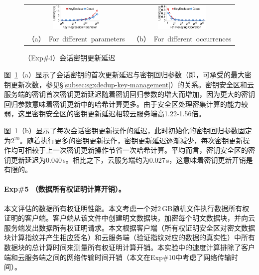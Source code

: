 \begin{figure}[!htb]
    \centering
    \begin{tabular}{@{\ }c@{\ }c}
    \includegraphics[width=0.48\textwidth]{pic/sgxdedup/expa5_keyRegression_time.pdf} &
    \includegraphics[width=0.48\textwidth]{pic/sgxdedup/expa5_keyRegression_time_default.pdf} \\
    \mbox{\small （a） For different parameters} &
    \mbox{\small （b） For different occurrences}
    \end{tabular}
    \caption{（Exp\#4）会话密钥更新延迟}
    \label{fig:sgxdedup-rekeyingLatency}
\end{figure}
    
图~\ref{fig:sgxdedup-rekeyingLatency}（a）显示了会话密钥的首次更新延迟与密钥回归参数（即，可承受的最大密钥更新次数，参见\S\ref{subsec:sgxdedup-key-management}）的关系。密钥安全区和云服务端的密钥首次密钥更新延迟随着密钥回归参数的增大而增加，因为更大的密钥回归参数意味着密钥更新中的哈希计算更多。由于安全区处理密集计算的能力较弱\cite{harnik2018SGX}，这里密钥安全区的密钥更新延迟相较云服务端高1.22-1.56倍。

图~\ref{fig:sgxdedup-rekeyingLatency}（b）显示了每次会话密钥更新操作的延迟，此时初始化的密钥回归参数固定为2$^{20}$。随着执行更多的密钥更新操作，密钥更新延迟逐渐减少，每次密钥更新操作均可相较于上一次密钥更新操作节省一次哈希计算。平均而言，密钥安全区的密钥更新延迟为0.040\,s。相比之下，云服务端约为0.027\,s，这意味着密钥更新开销是有限的。

\paragraph*{Exp\#5 （数据所有权证明计算开销）。}本文评估\sysnameS 的数据所有权证明性能。本文考虑一个对2\,GB随机文件执行数据所有权证明的客户端。客户端从该文件中创建明文数据块，加密每个明文数据块，并向云服务端发出数据所有权证明请求。本文根据客户端（所有权证明安全区对密文数据块计算指纹并产生相应签名）和云服务端（验证指纹对应的数据的真实性）中所有数据块的总计算时间来测量所有权证明计算开销。本实验中的速度计算排除了客户端和云服务端之间的网络传输时间开销（本文在Exp\#10中考虑了网络传输时间）。

